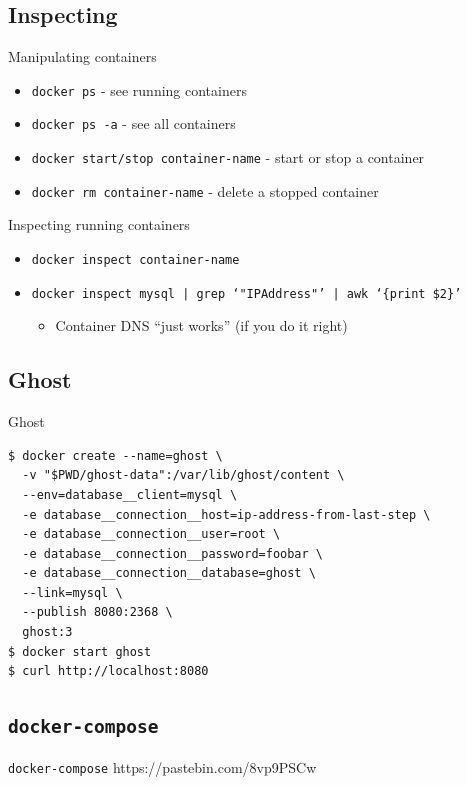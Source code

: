 \documentclass{beamer}
\begin{document}
\subsection{Inspecting}
\begin{frame}{Manipulating containers}
    \begin{itemize}
        \item \texttt{docker ps} - see running containers
        \item \texttt{docker ps -a} - see all containers
        \item \texttt{docker start/stop container-name} - start or stop a container
        \item \texttt{docker rm container-name} - delete a stopped container
    \end{itemize}
\end{frame}

\begin{frame}{Inspecting running containers}
   \begin{itemize}
       \item \texttt{docker inspect container-name}
       \item \texttt{docker inspect mysql | grep `"IPAddress"' | awk `\{print \$2\}'}
       \begin{itemize}
           \item Container DNS ``just works'' (if you do it right)
       \end{itemize}
   \end{itemize}
\end{frame}

\subsection{Ghost}
\begin{frame}[fragile]{Ghost}
\begin{lstlisting}
$ docker create --name=ghost \
  -v "$PWD/ghost-data":/var/lib/ghost/content \
  --env=database__client=mysql \
  -e database__connection__host=ip-address-from-last-step \
  -e database__connection__user=root \
  -e database__connection__password=foobar \
  -e database__connection__database=ghost \
  --link=mysql \
  --publish 8080:2368 \
  ghost:3
$ docker start ghost
$ curl http://localhost:8080
\end{lstlisting}
\end{frame}

\subsection{\texttt{docker-compose}}
\begin{frame}[fragile]{\texttt{docker-compose}}
https://pastebin.com/8vp9PSCw
\end{frame}
\end{document}
